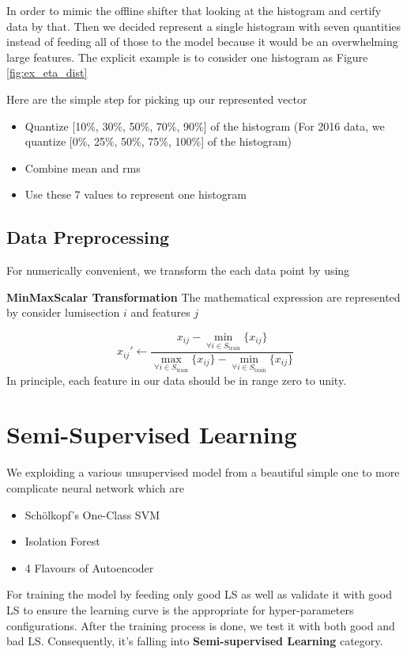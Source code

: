 In order to mimic the offline shifter that looking at the histogram and certify data by that.
Then we decided represent a single histogram with seven quantities instead of feeding all of those to the model because it would be an overwhelming large features.
The explicit example is to consider one histogram as Figure \ref{fig:ex_eta_dist}

Here are the simple step for picking up our represented vector
\begin{itemize}
    \item Quantize [10\%, 30\%, 50\%, 70\%, 90\%] of the histogram (For 2016 data, we quantize [0\%, 25\%, 50\%, 75\%, 100\%] of the histogram)
    \item Combine mean and rms
    \item Use these 7 values to represent one histogram
\end{itemize}


\subsection{Data Preprocessing}

For numerically convenient, we transform the each data point by using 

\textbf{MinMaxScalar Transformation} The mathematical expression are represented by consider lumisection $i$ and features $j$

\begin{equation}
    x_{ij}' \leftarrow \frac{x_{ij} - \min_{\forall i\in S_{\text{train}}}\{x_{ij}\}}{\max_{\forall i\in S_{\text{train}}}\{x_{ij}\} - \min_{\forall i\in S_{\text{train}}}\{x_{ij}\} }
\end{equation}
In principle, each feature in our data should be in range zero to unity.

\section{Semi-Supervised Learning}
We exploiding a various unsupervised model from a beautiful simple one to more complicate neural network which are
\begin{itemize}
    \item Sch\"{o}lkopf's One-Class SVM
    \item Isolation Forest
    \item 4 Flavours of Autoencoder
\end{itemize}
For training the model by feeding only good LS as well as validate it with good LS to ensure the learning curve is the appropriate for hyper-parameters configurations.
After the training process is done, we test it with both good and bad LS. Consequently, it's falling into \textbf{Semi-supervised Learning} category.

